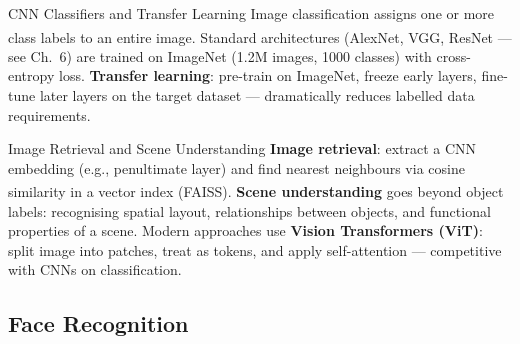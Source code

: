 \begin{v3topic}{CNN Classifiers and Transfer Learning}
    Image classification assigns one or more class labels to an entire image\textsuperscript{\cite[][p.~104]{fleuretLittleBookDeep}}.
    Standard architectures (AlexNet, VGG, ResNet --- see Ch.~6) are trained on ImageNet (1.2M images, 1000 classes) with cross-entropy loss.
    \textbf{Transfer learning}: pre-train on ImageNet, freeze early layers, fine-tune later layers on the target dataset --- dramatically reduces labelled data requirements.

\end{v3topic}
\begin{v3topic}{Image Retrieval and Scene Understanding}
    \textbf{Image retrieval}: extract a CNN embedding (e.g., penultimate layer) and find nearest neighbours via cosine similarity in a vector index (FAISS)\textsuperscript{\cite[][p.~104]{fleuretLittleBookDeep}}.
    \textbf{Scene understanding} goes beyond object labels: recognising spatial layout, relationships between objects, and functional properties of a scene.
    Modern approaches use \textbf{Vision Transformers (ViT)}: split image into patches, treat as tokens, and apply self-attention --- competitive with CNNs on classification.
\end{v3topic}

\subsection{Face Recognition}

